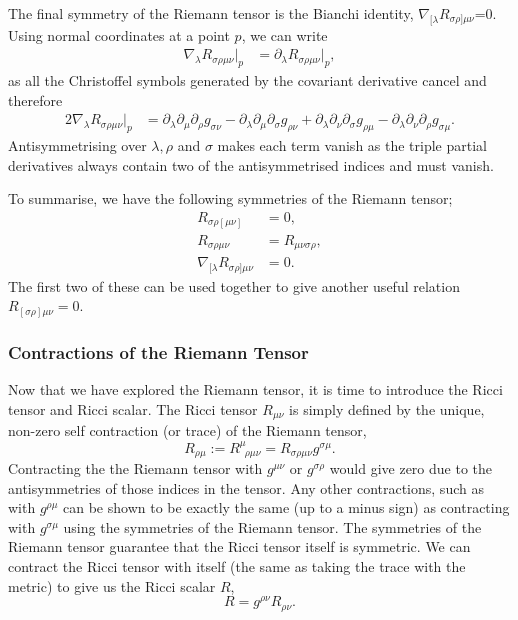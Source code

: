 The final symmetry of the Riemann tensor is the Bianchi identity, $\nabla_{[\lambda}R_{\sigma\rho]\mu\nu}$=0. Using normal coordinates at a point $p$, we can write
\begin{align}
\nabla_\lambda R_{\sigma\rho\mu\nu}\big|_p &= \partial_\lambda R_{\sigma\rho\mu\nu}\big|_p,
\end{align}
as all the Christoffel symbols generated by the covariant derivative cancel and therefore
\begin{align}
2\nabla_\lambda R_{\sigma\rho\mu\nu}\big|_p &= \partial_\lambda \partial_{\mu} \partial_\rho g_{\sigma\nu} - \partial_\lambda \partial_{\mu} \partial_\sigma g_{\rho\nu} + \partial_\lambda \partial_{\nu} \partial_\sigma g_{\rho\mu} - \partial_\lambda \partial_{\nu} \partial_\rho g_{\sigma\mu}.
\end{align}
Antisymmetrising over $\lambda,\rho$ and $\sigma$ makes each term vanish as the triple partial derivatives always contain two of the antisymmetrised indices and must vanish.

To summarise, we have the following symmetries of the Riemann tensor;
\begin{align}
R_{\sigma\rho[\mu\nu]}&=0, \\
R_{\sigma\rho\mu\nu}&=R_{\mu\nu\sigma\rho},\\
\nabla_{[\lambda}R_{\sigma\rho]\mu\nu}&=0. \label{intro:eq:bianchi}
\end{align}
 The first two of these can be used together to give another useful relation $R_{[\sigma\rho]\mu\nu} =0$.



\subsubsection{Contractions of the Riemann Tensor}
Now that we have explored the Riemann tensor, it is time to introduce the Ricci tensor and Ricci scalar. The Ricci tensor $R_{\mu\nu}$ is simply defined by the unique, non-zero self contraction (or trace) of the Riemann tensor,
\begin{equation}
R_{\rho\mu} := R^\mu_{\,\,\,\rho\mu\nu} = R_{\sigma\rho\mu\nu}g^{\sigma\mu}.
\end{equation}
Contracting the the Riemann tensor with $g^{\mu\nu}$ or $g^{\sigma\rho}$ would give zero due to the antisymmetries of those indices in the tensor. Any other contractions, such as with $g^{\rho\mu}$ can be shown to be exactly the same (up to a minus sign) as contracting with $g^{\sigma \mu}$ using the symmetries of the Riemann tensor. The symmetries of the Riemann tensor guarantee that the Ricci tensor itself is symmetric. We can contract the Ricci tensor with itself (the same as taking the trace with the metric) to give us the Ricci scalar $R$,
\begin{equation}
R=g^{\rho\nu}R_{\rho\nu}.
\end{equation}

